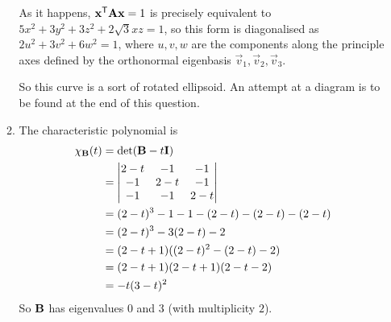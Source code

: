 \documentclass[fleqn,a4paper,11pt]{article}
\begin{document}
\begin{enumerate}[label=\textbf{\arabic*.}]
\begin{enumerate}[label=(\textbf{\Alph*})]
    As it happens, \(\mathrm{\mathbf{x}}^{\mathsf T} \mathbf{A} \mathrm{\mathbf{x}} = 1\) is precisely equivalent
    to \(5x^2 + 3y^2 + 3z^2 + 2\sqrt 3 xz = 1\), so this form is diagonalised as
    \(2u^2 + 3v^2 + 6w^2 = 1\), where \(u, v, w\) are the components along the
    principle axes defined by the orthonormal eigenbasis
    \(\vec v_1, \vec v_2, \vec v_3\).

    So this curve is a sort of rotated ellipsoid. An attempt at a diagram is to
    be found at the end of this question.
   \item
    The characteristic polynomial is
    \begin{align*}
     \chi_{\mathbf{B}}(t)
     &= \det(\mathbf{B} - t \mathbf{I}) \\
     &=
     \begin{vmatrix}
      2 - t & -1 & -1 \\
      -1 & 2 - t & -1 \\
      -1 & -1 & 2 - t
     \end{vmatrix} \\
     &= (2 - t)^3 - 1 - 1 - (2 - t) - (2 - t) - (2 - t) \\
     &= (2 - t)^3 - 3(2 - t) - 2 \\
     &= (2 - t + 1)((2 - t)^2 - (2 - t) - 2) \\
     &= (2 - t + 1)(2 - t + 1)(2 - t-  2) \\
     &= -t(3 - t)^2
    \end{align*}
    So \(\mathbf{B}\) has eigenvalues \(0\) and \(3\) (with multiplicity \(2\)).


\end{enumerate}
\end{enumerate}
\end{document}
